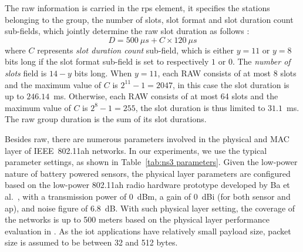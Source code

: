 The \gls{raw} information is carried in the \gls{rps} element, it specifies the stations belonging to the group, the number of slots, slot format and slot duration count sub-fields, which jointly determine the \gls{raw} slot duration as follows \cite{80211ahStd}: 
\begin{equation} \label{eq:Duration}
D = 500~\mu{}s + C \times 120~\mu{}s  
\end{equation}
where $C$ represents \textit{slot duration count} sub-field, which is either $y = 11$ or $y = 8$ bits long if the slot format sub-field is set to respectively $1$ or $0$. The \textit{number of slots} field is $14-y$ bits long. When $y = 11$, each RAW consists of at most 8 slots and the maximum value of $C$ is $2^{11}-1=2047$, in this case the slot duration is up to $246.14$~ms. Otherwise, each RAW consists of at most 64 slots and the maximum value of $C$ is $2^{8}-1=255$, the slot duration is thus limited to $31.1$~ms. The \gls{raw} group duration is the sum of its slot durations.



Besides \gls{raw}, there are numerous parameters involved in the physical and MAC layer of IEEE~802.11ah networks.
In our experiments, we use the typical parameter settings, 
as shown in Table~\ref{tab:ns3 parameters}. Given the low-power nature of battery powered sensors, the physical layer parameters are configured based on the low-power 802.11ah radio hardware prototype developed by Ba et al.~\cite{Ba2016}, with a transmission power of 0~dBm, a gain of 0~dBi (for both sensor and \gls{ap}), and noise figure of 6.8~dB. With such physical layer setting, the coverage of the networks is up to 500 meters based on the physical layer performance evaluation in \cite{bellekens2017outdoor}. As the \gls{iot} applications have relatively small payload size, packet size is assumed to be between  32 and 512 bytes.


